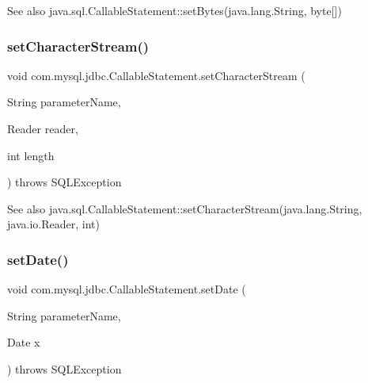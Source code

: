\begin{DoxySeeAlso}{See also}
java.\+sql.\+Callable\+Statement\+::set\+Bytes(java.\+lang.\+String, byte\mbox{[}\mbox{]}) 
\end{DoxySeeAlso}
\mbox{\label{classcom_1_1mysql_1_1jdbc_1_1_callable_statement_a0ce6d88c96d066a7010497f493e1c8a6}} 
\subsubsection{\texorpdfstring{set\+Character\+Stream()}{setCharacterStream()}}
{\footnotesize\ttfamily void com.\+mysql.\+jdbc.\+Callable\+Statement.\+set\+Character\+Stream (\begin{DoxyParamCaption}\item[{String}]{parameter\+Name,  }\item[{Reader}]{reader,  }\item[{int}]{length }\end{DoxyParamCaption}) throws S\+Q\+L\+Exception}

\begin{DoxySeeAlso}{See also}
java.\+sql.\+Callable\+Statement\+::set\+Character\+Stream(java.\+lang.\+String, java.\+io.\+Reader, int) 
\end{DoxySeeAlso}
\mbox{\label{classcom_1_1mysql_1_1jdbc_1_1_callable_statement_a9b7fdf2a24d93e82360a75ec55f799f6}} 
\subsubsection{\texorpdfstring{set\+Date()}{setDate()}\hspace{0.1cm}{\footnotesize\ttfamily [1/2]}}
{\footnotesize\ttfamily void com.\+mysql.\+jdbc.\+Callable\+Statement.\+set\+Date (\begin{DoxyParamCaption}\item[{String}]{parameter\+Name,  }\item[{Date}]{x }\end{DoxyParamCaption}) throws S\+Q\+L\+Exception}

